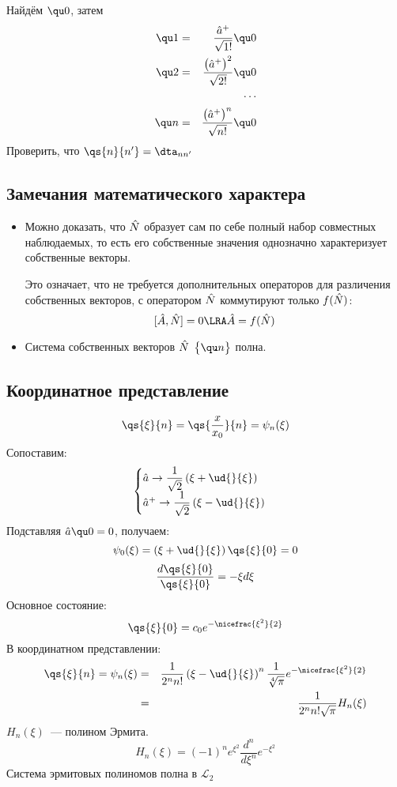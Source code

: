 \Ans Найдём $\qu 0$, затем
\begin{eqnarray*}
    \qu 1 &=& \dfrac{\Hat a^+}{\sqrt{1!}} \qu 0\\
    \qu 2 &=& \dfrac{\big(\Hat a^+\big)^2}{\sqrt{2!}} \qu 0\\
    && \cdots\\
    \qu n &=& \dfrac{\big(\Hat a^+\big)^n}{\sqrt{n!}} \qu 0\\
\end{eqnarray*}
\Exercise Проверить, что $\qs{n}{n'} = \dta_{nn'}$
\subsection{Замечания математического характера}
\begin{itemize}
  \item Можно доказать, что $\Hat N$ образует сам по себе полный набор совместных наблюдаемых, то есть его собственные значения однозначно характеризует собственные векторы.
      
      Это означает, что не требуется дополнительных операторов для  различения собственных векторов, с оператором $\Hat N$ коммутируют только $f(\Hat N)$:
      $$
        [\Hat A, \Hat N] = 0 \LRA \Hat A = f(\Hat N)      $$
  \item Система собственных векторов $\Hat N$ $\big\{ \qu n \big\}$ полна.
\end{itemize}
\subsection{Координатное представление}
$$
    \qs{\xi}{n} = \qs{\frac{x}{x_0}}{n} = \psi_n (\xi)
$$
Сопоставим:
$$
    \begin{cases}
        \Hat a \to \dfrac{1}{\sqrt{2}} \left( \xi + \ud{}{\xi} \right)\\
        \Hat a^+ \to \dfrac{1}{\sqrt{2}} \left( \xi - \ud{}{\xi} \right)
    \end{cases}
$$
Подставляя $\Hat a \qu 0 = 0$, получаем:
$$
    \psi_0(\xi) = \left( \xi + \ud{}{\xi} \right) \qs{\xi}{0} = 0
$$
$$
    \dfrac{d \qs{\xi}{0}}{\qs{\xi}{0}} = -\xi d \xi
$$
Основное состояние:
$$
    \qs{\xi}{0} = c_0 e^{-\nicefrac{\xi^2}{2}}
$$
В координатном представлении:
\begin{eqnarray*}
    \qs{\xi}{n} = \psi_n(\xi) &=& \dfrac{1}{2^n n!} \left( \xi - \ud{}{\xi} \right)^n \dfrac{1}{\sqrt[4]{\pi}} e^{-\nicefrac{\xi^2}{2}}\\
                              &=& \dfrac{1}{2^n n! \sqrt{\pi}} H_n(\xi)
\end{eqnarray*}
$H_n(\xi)$~--- полином Эрмита.
$$
    H_n(\xi) = (-1)^n e^{\xi^2} \dfrac{d^n}{d \xi^n} e^{-\xi^2}
$$
Система эрмитовых полиномов полна в $\mathcal{L}_2$
